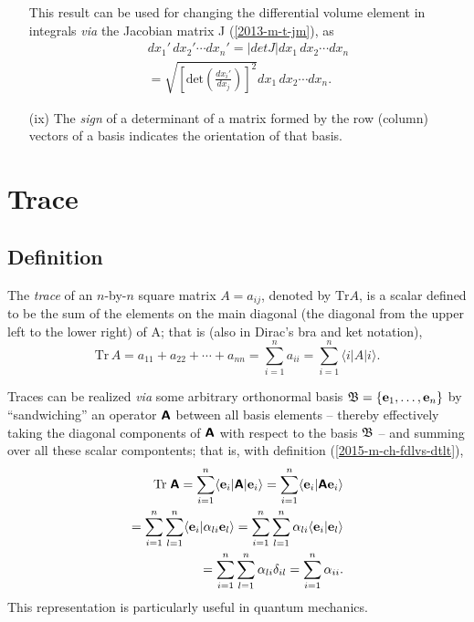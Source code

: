 \begin{itemize}
This result can be used for changing the differential volume element in integrals {\it via} the Jacobian matrix J
(\ref{2013-m-t-jm}), as
\begin{equation}
\begin{split}
dx_1'\, dx_2' \cdots dx_n'
= \vert det J \vert dx_1\, dx_2 \cdots dx_n     \\
= \sqrt{\left[\textrm{det}\left(\frac{dx_i'}{dx_j}\right)\right]^2} dx_1\, dx_2 \cdots dx_n
.
\end{split}
\end{equation}

\item[(ix)]
The {\em sign} of a  determinant of a matrix formed by the row (column)
 vectors of a basis indicates the {orientation}
of that basis.

\end{itemize}


\section{Trace}
\label{2013-ch-fdvs-trace}

\subsection{Definition}
The {\em trace} of an $n$-by-$n$ square matrix $A=a_{ij}$, denoted by
$\textrm{Tr} A$,  is a scalar
defined to be the sum of the elements on the main diagonal
 (the diagonal from the upper left to the lower right) of A; that is  (also in Dirac's bra and ket notation),
\begin{equation}
\textrm{Tr}\,A
= a_{11} +a_{22}+ \cdots +a_{nn}
=\sum_{i=1}^n a_{ii}=\sum_{i=1}^n \langle i \vert A\vert i \rangle.
\end{equation}

Traces can be realized {\it via} some arbitrary orthonormal basis ${\frak B} =\{
{\bf e}_1,
\ldots ,
{\bf e}_n
\}$
by ``sandwiching'' an operator $\textsf{\textbf{A}}$ between all basis elements -- thereby effectively taking the diagonal components
of    $\textsf{\textbf{A}}$ with respect to the basis ${\frak B}$ --
and summing over all these scalar compontents; that is, with definition (\ref{2015-m-ch-fdlvs-dtlt}),
\begin{equation}
\begin{split}
\textrm{Tr}\;\textsf{\textbf{A}}
=\sum_{i=1}^n   \langle {\bf e}_i \vert \textsf{\textbf{A}} \vert {\bf e}_i \rangle
=\sum_{i=1}^n   \langle {\bf e}_i \vert \textsf{\textbf{A}}  {\bf e}_i \rangle  \\
=\sum_{i=1}^n  \sum_{l=1}^n  \langle {\bf e}_i \vert \alpha_{li}  {\bf e}_l \rangle
=\sum_{i=1}^n  \sum_{l=1}^n  \alpha_{li} \langle {\bf e}_i \vert  {\bf e}_l \rangle \\
=\sum_{i=1}^n  \sum_{l=1}^n  \alpha_{li} \delta_{il}
=\sum_{i=1}^n   \alpha_{ii}
.
\end{split}
\end{equation}
This representation is particularly useful in quantum mechanics.


